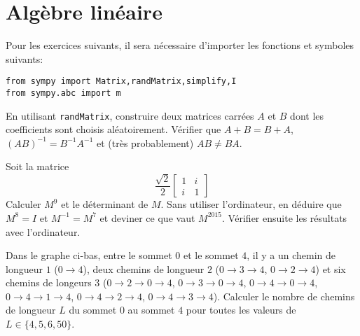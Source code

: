 
\section{Algèbre linéaire}

Pour les exercices suivants, il sera nécessaire d'importer les fonctions
et symboles suivants:
\begin{verbatim}
from sympy import Matrix,randMatrix,simplify,I
from sympy.abc import m
\end{verbatim}


\begin{exercice}
    En utilisant \texttt{randMatrix}, construire deux matrices carrées 
$A$ et $B$ dont les coefficients sont choisis aléatoirement. Vérifier que
$A+B=B+A$, $(AB)^{-1}=B^{-1}A^{-1}$ et (très probablement) $AB\neq BA$.
\end{exercice}

\begin{exercice}
Soit la matrice
\[
\frac{\sqrt{2}}{2}
\left[\begin{matrix}1 & i\\i & 1\end{matrix}\right]
\]
Calculer $M^9$ et le déterminant de $M$. Sans utiliser l'ordinateur, en déduire
que $M^8=I$ et $M^{-1}=M^7$ et deviner ce que vaut $M^{2015}$. Vérifier ensuite
les résultats avec l'ordinateur.
\end{exercice}


\begin{exercice}
    Dans le graphe ci-bas, entre le sommet $0$ et le sommet $4$, il y a 
    un chemin de longueur $1$ ($0\to4$),
    deux chemins de longueur $2$ ($0\to3\to4$, $0\to2\to4$) et 
    six chemins de longeurs $3$ 
    ($0\to2\to0\to4$, $0\to3\to0\to4$, $0\to4\to0\to4$, $0\to4\to1\to4$, 
    $0\to4\to2\to4$, $0\to4\to3\to4$).  
    Calculer le
    nombre de chemins de longueur $L$ du sommet $0$ au sommet $4$ pour toutes
    les valeurs de $L\in\{4,5,6,50\}$.
\begin{center}
\end{center}
\end{exercice}

